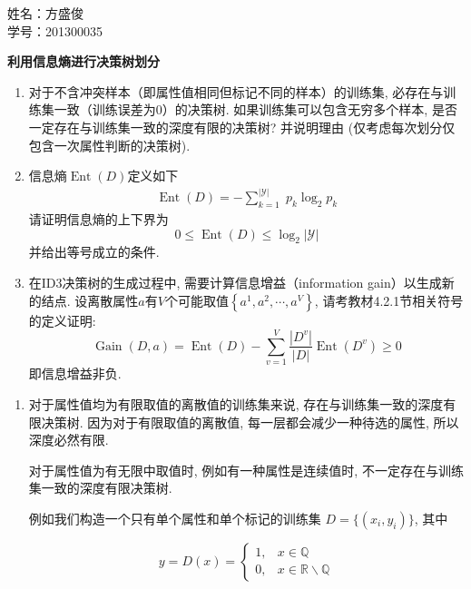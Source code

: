 \documentclass[answers]{exam}  %
\begin{document}
\Large
\noindent
姓名：方盛俊 \\
学号：201300035 \\
\begin{questions}
  \question [20] \textbf{利用信息熵进行决策树划分}

  \begin{enumerate}
    \item  对于不含冲突样本（即属性值相同但标记不同的样本）的训练集, 必存在与训练集一致（训练误差为0）的决策树. 如果训练集可以包含无穷多个样本, 是否一定存在与训练集一致的深度有限的决策树? 并说明理由 (仅考虑每次划分仅包含一次属性判断的决策树).
    \item
          信息熵$\operatorname{Ent}(D)$定义如下
          \begin{align}
            \operatorname{Ent}(D)=-\sum_{k=1}^{|\mathcal{Y}|}\; p_{k} \log_{2} p_{k}\label{ch4_eq:entropy}
          \end{align}
          请证明信息熵的上下界为
          \begin{equation}
            0 \leq \operatorname{Ent}(D)\leq \log _{2}|\mathcal{Y}|
          \end{equation}
          并给出等号成立的条件.
    \item  在ID3决策树的生成过程中, 需要计算信息增益（information gain）以生成新的结点. 设离散属性$a$有$V$个可能取值$\left\{a^{1}, a^{2}, \cdots, a^{V}\right\}$, 请考教材4.2.1节相关符号的定义证明:
          \begin{equation}
            \operatorname{Gain}(D, a)=\operatorname{Ent}(D)-\sum_{v=1}^{V} \frac{\left|D^{v}\right|}{|D|} \operatorname{Ent}\left(D^{v}\right) \geq 0
          \end{equation}
          即信息增益非负.
  \end{enumerate}
  \begin{solution}
    \begin{enumerate}
      \item

            对于属性值均为有限取值的离散值的训练集来说, 存在与训练集一致的深度有限决策树. 因为对于有限取值的离散值, 每一层都会减少一种待选的属性, 所以深度必然有限.

            对于属性值为有无限中取值时, 例如有一种属性是连续值时, 不一定存在与训练集一致的深度有限决策树.

            例如我们构造一个只有单个属性和单个标记的训练集 $D = \{ (x_{i}, y_{i}) \}$, 其中

            $$
              y = D(x) =
              \begin{cases}
                1, & x \in \mathbb{Q}                       \\
                0, & x \in \mathbb{R} \backslash \mathbb{Q}
              \end{cases}
            $$


\end{enumerate}
\end{solution}
\end{questions}
\end{document}
